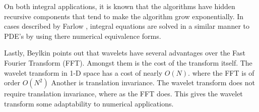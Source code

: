 On both integral applications, it is known that the algorithms have hidden recursive components that tend to make the algorithm grow exponentially.    In cases described by Farlow \cite{PDEfSE}, integral equations are solved in a similar manner to PDE's by using there numerical equivalence forms.  

Lastly, Beylkin points out that wavelets have several advantages over the Fast Fourier Transform (FFT).  Amongst them is the cost of the transform itself.  The wavelet transform in 1-D space has a cost of nearly $O (N)$. where the FFT is of order $O(N^2)$  Another is translation invariance.  The wavelet transform does not require translation invariance, where as the FFT does.  This gives the wavelet transform some adaptability to numerical applications.  








